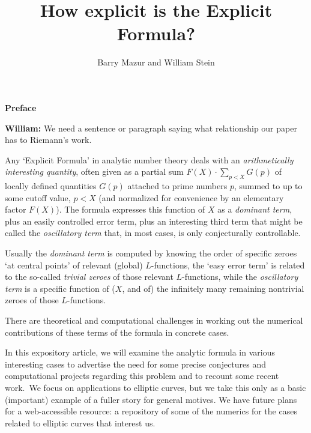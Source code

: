 \documentclass[11pt]{article}
\title{How explicit is the Explicit Formula?}
\author{Barry Mazur and William Stein}
\theoremstyle{plain}
\theoremstyle{definition}
\numberwithin{equation}{section}
\numberwithin{figure}{section}
\numberwithin{table}{section}
\begin{document}
\maketitle


\vskip10pt
\centerline{\bf Preface}
\vskip10pt

{\bf William:}  We need a sentence or paragraph saying what relationship our paper has to Riemann's work.

 Any `Explicit Formula' in analytic number theory deals with an {\it arithmetically interesting quantity}, often given as a partial sum $F(X)\cdot\sum_{p<X}G(p)$ of locally defined quantities $G(p)$ attached to prime numbers $p$, summed to up to some cutoff value, $p<X$  (and normalized for convenience by an elementary factor $F(X)$). The formula expresses this function of $X$  as a {\it dominant term}, plus an easily controlled error term, plus an interesting third term that might be called the {\it oscillatory term} that, in most cases, is only conjecturally controllable.

  Usually the {\it dominant term} is computed by knowing the order of specific zeroes `at central points' of relevant (global) $L$-functions, the `easy error term' is related to the so-called {\it trivial zeroes} of those relevant $L$-functions, while the {\it oscillatory term} is  a specific function of ($X$, and of) the infinitely many remaining nontrivial zeroes of those $L$-functions.


 There are theoretical and computational challenges in working out the  numerical contributions of these terms of the formula in concrete cases.

   In this expository article, we will examine the analytic formula in various interesting cases to advertise the need for some  precise conjectures and computational projects regarding this problem and to recount some recent work.\  We focus on applications to elliptic curves, but we take this only as a basic (important) example of a fuller story for general motives.  We have  future plans for a web-accessible resource: a repository of some of the numerics for the cases related to elliptic curves that interest us.
\end{document}
